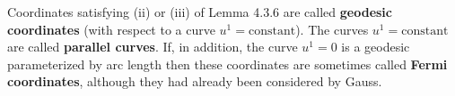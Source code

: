 Coordinates satisfying (ii) or (iii) of Lemma 4.3.6 are called \textbf{geodesic coordinates} (with respect to a curve $u^1 = \text{constant}$). The curves $u^1 = \text{constant}$ are called \textbf{parallel curves}. If, in addition, the curve $u^1 = 0$ is a geodesic parameterized by arc length then these coordinates are sometimes called \textbf{Fermi coordinates}, although they had already been considered by Gauss.
